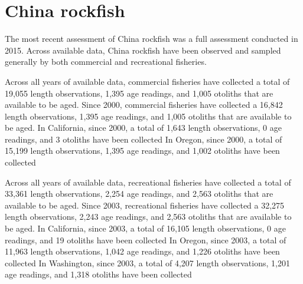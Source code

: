 \documentclass[11pt,
  english,
  letterpaper,
]{article}
\begin{document}

\hypertarget{china-rockfish}{%
\section{China rockfish}\label{china-rockfish}}

\leavevmode\tagmcend\tagstructend


The most recent assessment of China rockfish was a full assessment conducted in 2015. Across available data, China rockfish have been observed and sampled generally by both commercial and recreational fisheries.

\leavevmode\tagmcend\tagstructend\par


Across all years of available data, commercial fisheries have collected a total of 19,055 length observations, 1,395 age readings, and 1,005 otoliths that are available to be aged. Since 2000, commercial fisheries have collected a 16,842 length observations, 1,395 age readings, and 1,005 otoliths that are available to be aged. In California, since 2000, a total of 1,643 length observations, 0 age readings, and 3 otoliths have been collected In Oregon, since 2000, a total of 15,199 length observations, 1,395 age readings, and 1,002 otoliths have been collected

\leavevmode\tagmcend\tagstructend\par


Across all years of available data, recreational fisheries have collected a total of 33,361 length observations, 2,254 age readings, and 2,563 otoliths that are available to be aged. Since 2003, recreational fisheries have collected a 32,275 length observations, 2,243 age readings, and 2,563 otoliths that are available to be aged. In California, since 2003, a total of 16,105 length observations, 0 age readings, and 19 otoliths have been collected In Oregon, since 2003, a total of 11,963 length observations, 1,042 age readings, and 1,226 otoliths have been collected In Washington, since 2003, a total of 4,207 length observations, 1,201 age readings, and 1,318 otoliths have been collected

\leavevmode\tagmcend\tagstructend\par
\end{document}
